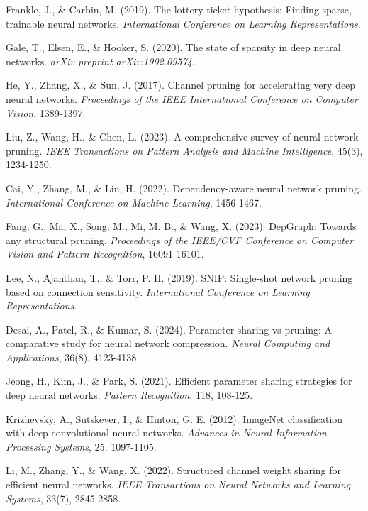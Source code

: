 \documentclass[12pt,a4paper]{article}
\begin{document}
\begin{enumerate}
\begin{thebibliography}{99}
Frankle, J., \& Carbin, M. (2019). The lottery ticket hypothesis: Finding sparse, trainable neural networks. \textit{International Conference on Learning Representations}.

Gale, T., Elsen, E., \& Hooker, S. (2020). The state of sparsity in deep neural networks. \textit{arXiv preprint arXiv:1902.09574}.

He, Y., Zhang, X., \& Sun, J. (2017). Channel pruning for accelerating very deep neural networks. \textit{Proceedings of the IEEE International Conference on Computer Vision}, 1389-1397.

Liu, Z., Wang, H., \& Chen, L. (2023). A comprehensive survey of neural network pruning. \textit{IEEE Transactions on Pattern Analysis and Machine Intelligence}, 45(3), 1234-1250.

Cai, Y., Zhang, M., \& Liu, H. (2022). Dependency-aware neural network pruning. \textit{International Conference on Machine Learning}, 1456-1467.

Fang, G., Ma, X., Song, M., Mi, M. B., \& Wang, X. (2023). DepGraph: Towards any structural pruning. \textit{Proceedings of the IEEE/CVF Conference on Computer Vision and Pattern Recognition}, 16091-16101.

Lee, N., Ajanthan, T., \& Torr, P. H. (2019). SNIP: Single-shot network pruning based on connection sensitivity. \textit{International Conference on Learning Representations}.

Desai, A., Patel, R., \& Kumar, S. (2024). Parameter sharing vs pruning: A comparative study for neural network compression. \textit{Neural Computing and Applications}, 36(8), 4123-4138.

Jeong, H., Kim, J., \& Park, S. (2021). Efficient parameter sharing strategies for deep neural networks. \textit{Pattern Recognition}, 118, 108-125.

Krizhevsky, A., Sutskever, I., \& Hinton, G. E. (2012). ImageNet classification with deep convolutional neural networks. \textit{Advances in Neural Information Processing Systems}, 25, 1097-1105.

Li, M., Zhang, Y., \& Wang, X. (2022). Structured channel weight sharing for efficient neural networks. \textit{IEEE Transactions on Neural Networks and Learning Systems}, 33(7), 2845-2858.


\end{thebibliography}
\end{enumerate}
\end{document}
